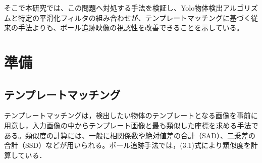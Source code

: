 \documentclass[11pt,a4j]{jreport}
\begin{document}


そこで本研究では、この問題へ対処する手法を検証し、Yolo物体検出アルゴリズムと特定の平滑化フィルタの組み合わせが、テンプレートマッチングに基づく従来の手法よりも、ボール追跡映像の視認性を改善できることを示している。

\chapter{準備}
\section{テンプレートマッチング}
テンプレートマッチングは，検出したい物体のテンプレートとなる画像を事前に用意し，入力画像の中からテンプレート画像と最も類似した座標を求める手法である。\cite{画像処理}類似度の計算には、一般に相関係数や絶対値差の合計（SAD）、二乗差の合計（SSD）などが用いられる。ボール追跡手法では，(3.1)式により類似度を計算している．\cite{画像解析}
\end{document}
